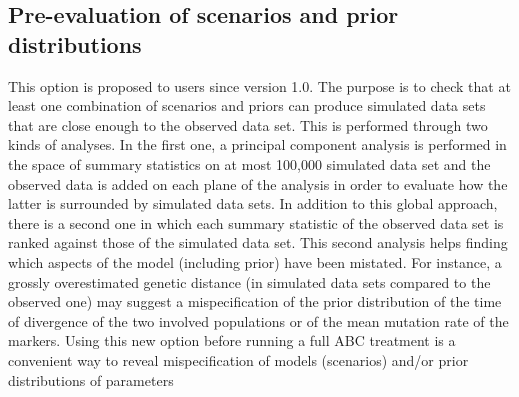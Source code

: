 \subsection{Pre-evaluation of scenarios and prior distributions}
This option is proposed to users since version 1.0. The purpose is to check that at least one combination of scenarios and priors can produce simulated data sets that are close enough to the observed data set. This is performed through two kinds of analyses. In the first one, a principal component analysis is performed in the space of summary statistics on at most 100,000 simulated data set and the observed data is added on each plane of the analysis in order to evaluate how the latter is surrounded by simulated data sets. In addition to this global approach, there is a second one in which each summary statistic of the observed data set is ranked against those of the simulated data set. This second analysis helps finding which aspects of the model (including prior) have been mistated. For instance, a grossly overestimated genetic distance (in simulated data sets compared to the observed one) may suggest a mispecification of the prior distribution of the time of divergence of the two involved populations or of the mean mutation rate of the markers. Using this new option before running a full ABC treatment is a convenient way to reveal mispecification of models (scenarios) and/or prior distributions of parameters \citep[see][for an illustration]{C2010}

